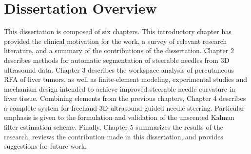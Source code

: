 \section{Dissertation Overview}
This dissertation is composed of six chapters. This introductory chapter has provided the clinical motivation for the work, a survey of relevant research literature, and a summary of the contributions of the dissertation. Chapter 2 describes methods for automatic segmentation of steerable needles from 3D ultrasound data. Chapter 3 describes the workspace analysis of percutaneous RFA of liver tumors, as well as finite-element modeling, experimental studies and mechanism design intended to achieve improved steerable needle curvature in liver tissue. Combining elements from the previous chapters, Chapter 4 describes a complete system for freehand-3D-ultrasound-guided needle steering. Particular emphasis is given to the formulation and validation of the unscented Kalman filter estimation scheme. Finally, Chapter 5 summarizes the results of the research, reviews the contribution made in this dissertation, and provides suggestions for future work.